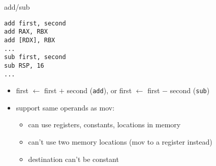 \begin{frame}[fragile,label=addSub]{add/sub}
\begin{lstlisting}
add first, second
add RAX, RBX
add [RDX], RBX
...
sub first, second
sub RSP, 16
...
\end{lstlisting}
\begin{itemize}
    \item first $\leftarrow$ first $+$ second (\texttt{add}), or first $\leftarrow$ first $-$ second (\texttt{sub})
\item support same operands as mov:
    \begin{itemize}
    \item can use registers, constants, locations in memory
    \item can't use two memory locations (mov to a register instead)
    \item destination can't be constant
    \end{itemize}
\end{itemize}
\end{frame}
